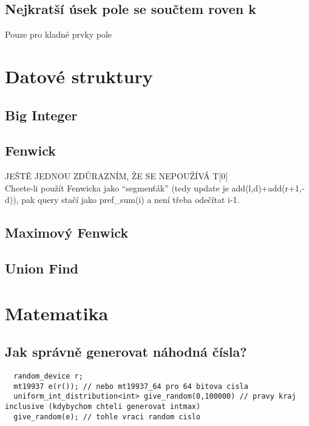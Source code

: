 \documentclass[10pt, a4paper]{article}
\begin{document}
\subsection{Nejkratší úsek pole se součtem roven k}
Pouze pro kladné prvky pole


\newpage

\section{Datové struktury}

\subsection{Big Integer}


\subsection{Fenwick}
JEŠTĚ JEDNOU ZDŮRAZNÍM, ŽE SE NEPOUŽÍVÁ T[0]\\
Chcete-li použít Fenwicka jako ``segmenťák'' (tedy update je add(l,d)+add(r+1,-d)), pak query stačí jako pref\_sum(i) a není třeba odečítat i-1.


\subsection{Maximový Fenwick}


\subsection{Union Find}


\newpage

\section{Matematika}

\subsection{Jak správně generovat náhodná čísla?}
\begin{lstlisting}
  random_device r;
  mt19937 e(r()); // nebo mt19937_64 pro 64 bitova cisla
  uniform_int_distribution<int> give_random(0,100000) // pravy kraj inclusive (kdybychom chteli generovat intmax)
  give_random(e); // tohle vraci random cislo
\end{lstlisting}
\end{document}
